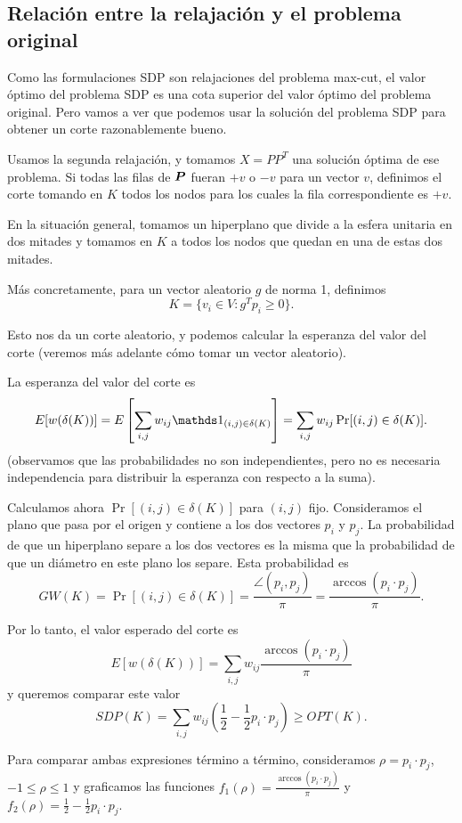 \subsection{Relación entre la relajación y el problema original}

Como las formulaciones SDP son relajaciones del problema max-cut, el valor óptimo del problema SDP es una cota superior del valor óptimo del problema original. Pero vamos a ver que podemos usar la solución del problema SDP para obtener un corte razonablemente bueno.

Usamos la segunda relajación, y tomamos $X = PP^T$ una solución óptima de ese problema. Si todas las filas de $\bm{P}$ fueran $+v$ o $-v$ para un vector $v$, definimos el corte tomando en $K$ todos los nodos para los cuales la fila correspondiente es $+v$.

En la situación general, tomamos un hiperplano que divide a la esfera unitaria en dos mitades y tomamos en $K$ a todos los nodos que quedan en una de estas dos mitades.

Más concretamente, para un vector aleatorio $g$ de norma 1, definimos
$$
K = \{v_i \in V: g^T p_i \ge 0\}.
$$

Esto nos da un corte aleatorio, y podemos calcular la esperanza  del valor del corte (veremos más adelante cómo tomar un vector aleatorio).

La esperanza del valor del corte es
$$
E[w(\delta(K))] = E\left[\sum_{i,j} w_{ij} \one_{(i,j) \in \delta(K)}\right] = \sum_{i,j} w_{ij} \Pr[(i,j) \in \delta(K)].
$$
(observamos que las probabilidades no son independientes, pero no es necesaria independencia para distribuir la esperanza con respecto a la suma).

Calculamos ahora $\Pr[(i,j) \in \delta(K)]$ para $(i,j)$ fijo. Consideramos el plano que pasa por el origen y contiene a los dos vectores $p_i$ y $p_j$. La probabilidad de que un hiperplano separe a los dos vectores es la misma que la probabilidad de que un diámetro en este plano los separe. Esta probabilidad es
$$
GW(K) = \Pr[(i,j) \in \delta(K)] = \frac{\angle(p_i, p_j)}{\pi} = \frac{\arccos(p_i \cdot p_j)}{\pi}.
$$

Por lo tanto, el valor esperado del corte es
$$
E[w(\delta(K))] = \sum_{i,j} w_{ij} \frac{\arccos(p_i \cdot p_j)}{\pi}
$$
y queremos comparar este valor
$$
SDP(K) = \sum_{i,j} w_{ij} \left( \frac{1}{2} - \frac{1}{2} p_i \cdot p_j \right) \ge OPT(K).
$$

Para comparar ambas expresiones término a término, consideramos $\rho = p_i \cdot p_j$, $-1 \le \rho \le 1$ y graficamos las funciones $f_1(\rho) = \frac{\arccos(p_i \cdot p_j)}{\pi}$ y $f_2(\rho)  = \frac{1}{2} - \frac{1}{2} p_i \cdot p_j$.

